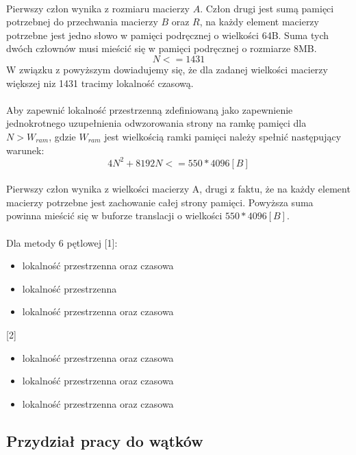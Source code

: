 \documentclass{scrartcl}
\begin{document}
\paragraph{}Pierwszy człon wynika z rozmiaru macierzy $A$. Człon drugi jest sumą pamięci potrzebnej do przechwania macierzy $B$ oraz $R$, na każdy element macierzy potrzebne jest jedno słowo w pamięci podręcznej o wielkości 64B. Suma tych dwóch człownów musi mieścić się w pamięci podręcznej o rozmiarze 8MB. \\
\begin{equation}
N <= 1431
\end{equation}
W związku z powyższym dowiadujemy się, że dla zadanej wielkości macierzy większej niz 1431 tracimy lokalność czasową.\\
\\
Aby zapewnić lokalność przestrzenną zdefiniowaną jako zapewnienie jednokrotnego uzupełnienia odwzorowania strony na ramkę pamięci dla $N > W_{ram}$, gdzie $W_{ram}$ jest wielkością ramki pamięci należy spełnić następujący warunek:
\begin{equation}
4N ^ 2 + 8192 N <= 550 * 4096 [B]
\end{equation}
\paragraph{}Pierwszy człon wynika z wielkości macierzy A, drugi z faktu, że na każdy element macierzy potrzebne jest zachowanie całej strony pamięci. Powyższa suma powinna mieścić się w buforze translacji o wielkości $550 * 4096[B]$.
\paragraph{}
Dla metody 6 pętlowej [1]:
\begin{itemize}
\item lokalność przestrzenna oraz czasowa
\item lokalność przestrzenna
\item lokalność przestrzenna oraz czasowa
\end{itemize}
[2]
\begin{itemize}
\item lokalność przestrzenna oraz czasowa
\item lokalność przestrzenna oraz czasowa
\item lokalność przestrzenna oraz czasowa
\end{itemize}
\subsection{Przydział pracy do wątków}
\end{document}
